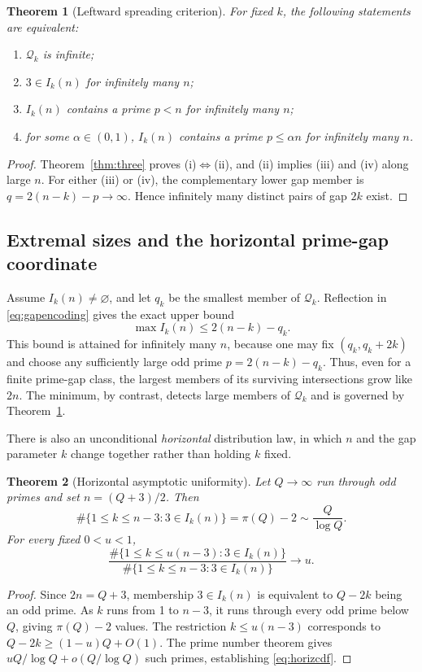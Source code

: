 \documentclass[11pt,a4paper]{article}
\newtheorem{theorem}{Theorem}[section]
\theoremstyle{definition}
\newcommand{\Qcal}{\mathcal Q}
\begin{document}
\begin{theorem}[Leftward spreading criterion]\label{thm:spreading}
For fixed $k$, the following statements are equivalent:
\begin{enumerate}[label=(\roman*),topsep=2pt,itemsep=1pt]
\item $\Qcal_k$ is infinite;
\item $3\in I_k(n)$ for infinitely many $n$;
\item $I_k(n)$ contains a prime $p<n$ for infinitely many $n$;
\item for some $\alpha\in(0,1)$, $I_k(n)$ contains a prime $p\le\alpha n$ for infinitely many $n$.
\end{enumerate}
\end{theorem}
\begin{proof}
Theorem~\ref{thm:three} proves (i)$\Leftrightarrow$(ii), and (ii) implies (iii) and (iv) along large $n$. For either (iii) or (iv), the complementary lower gap member is $q=2(n-k)-p\to\infty$. Hence infinitely many distinct pairs of gap $2k$ exist.
\end{proof}

\subsection{Extremal sizes and the horizontal prime-gap coordinate}
Assume $I_k(n)\ne\varnothing$, and let $q_k$ be the smallest member of $\Qcal_k$. Reflection in \eqref{eq:gapencoding} gives the exact upper bound
\begin{equation}\label{eq:maxbound}
 \max I_k(n)\le 2(n-k)-q_k.
\end{equation}
This bound is attained for infinitely many $n$, because one may fix $(q_k,q_k+2k)$ and choose any sufficiently large odd prime $p=2(n-k)-q_k$. Thus, even for a finite prime-gap class, the largest members of its surviving intersections grow like $2n$. The minimum, by contrast, detects large members of $\Qcal_k$ and is governed by Theorem~\ref{thm:spreading}.

There is also an unconditional \emph{horizontal} distribution law, in which $n$ and the gap parameter $k$ change together rather than holding $k$ fixed.
\begin{theorem}[Horizontal asymptotic uniformity]\label{thm:horizontal}
Let $Q\to\infty$ run through odd primes and set $n=(Q+3)/2$. Then
\[
 \#\{1\le k\le n-3:3\in I_k(n)\}=\pi(Q)-2
 \sim\frac{Q}{\log Q}.
\]
For every fixed $0<u<1$,
\begin{equation}\label{eq:horizcdf}
 \frac{\#\{1\le k\le u(n-3):3\in I_k(n)\}}{\#\{1\le k\le n-3:3\in I_k(n)\}}
 \longrightarrow u.
\end{equation}
\end{theorem}
\begin{proof}
Since $2n=Q+3$, membership $3\in I_k(n)$ is equivalent to $Q-2k$ being an odd prime. As $k$ runs from 1 to $n-3$, it runs through every odd prime below $Q$, giving $\pi(Q)-2$ values. The restriction $k\le u(n-3)$ corresponds to $Q-2k\ge(1-u)Q+O(1)$. The prime number theorem gives $uQ/\log Q+o(Q/\log Q)$ such primes, establishing \eqref{eq:horizcdf}.
\end{proof}
\end{document}
